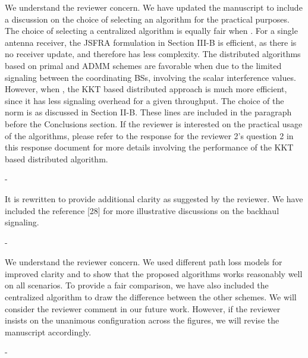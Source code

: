 \begin{enumerate}
\begin{enumerate}
	\resp We understand the reviewer concern. We have updated the manuscript to include a discussion on the choice of selecting an algorithm for the practical purposes. The choice of selecting a centralized algorithm is equally fair when . For a single antenna receiver, the \ac{JSFRA} formulation in Section III-B is efficient, as there is no receiver update, and therefore has less complexity. The distributed algorithms based on primal and \ac{ADMM} schemes are favorable when  due to the limited signaling between the coordinating \acp{BS}, involving the scalar interference values. However, when , the \ac{KKT} based distributed approach is much more efficient, since it has less signaling overhead for a given throughput. The choice of the  norm is as discussed in Section II-B. These lines are included in the paragraph before the Conclusions section. If the reviewer is interested on the practical usage of the algorithms, please refer to the response for the reviewer 2's question 2 in this response document for more details involving the performance of the KKT based distributed algorithm.
	
	 - 
	
	\resp It is rewritten to provide additional clarity as suggested by the reviewer. We have included the reference [28] for more illustrative discussions on the backhaul signaling. 
	
	 - 
	
	\resp We understand the reviewer concern. We used different path loss models for improved clarity and to show that the proposed algorithms works reasonably well on all scenarios. To provide a fair comparison, we have also included the centralized algorithm to draw the difference between the other schemes. We will consider the reviewer comment in our future work. However, if the reviewer insists on the unanimous configuration across the figures, we will revise the manuscript accordingly.
	
	 - 
	

\end{enumerate}
\end{enumerate}
